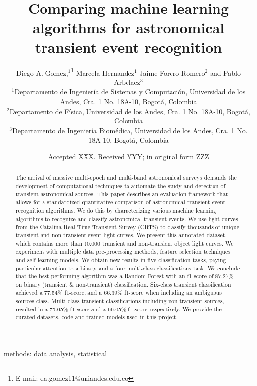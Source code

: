 \documentclass[a4paper,fleqn,usenatbib]{mnras}
\title[Comparing machine learning algorithms for astronomical transient event recognition]{Comparing machine learning algorithms for astronomical transient event recognition}
\author[Diego. A. Gomez et al.]{
Diego A. Gomez,$^{1}$\thanks{E-mail: da.gomez11@uniandes.edu.co}
Marcela Hernandez$^{1}$   
Jaime Forero-Romero$^{2}$
and Pablo Arbelaez$^{3}$
\\
$^{1}$Departamento de Ingenier\'ia de Sistemas y Computaci\'on, Universidad de los Andes, Cra. 1 No. 18A-10, Bogot\'a, Colombia\\
$^{2}$Departamento de F\'isica, Universidad de los Andes, Cra. 1 No. 18A-10, Bogot\'a, Colombia\\
$^{3}$Departamento de Ingenier\'ia Biom\'edica, Universidad de los Andes, Cra. 1 No. 18A-10, Bogot\'a, Colombia
}
\date{Accepted XXX. Received YYY; in original form ZZZ}
\begin{document}
\label{firstpage}
\pagerange{\pageref{firstpage}--\pageref{lastpage}}
\maketitle

\begin{abstract}




The arrival of massive multi-epoch and multi-band astronomical surveys
demands the development of computational techniques to automate the
study and detection of transient astronomical sources. 
This paper describes an evaluation framework that allows for a standardized quantitative comparison of astronomical transient event recognition algorithms. 
We do this by characterizing various machine learning algorithms to
recognize and classify astronomical transient events.
We use light-curves from the Catalina Real Time Transient Survey
(CRTS) to classify thousands of unique transient and non-transient
event light-curves.
We present this annotated dataset, which contains more than $10.000$ transient and non-transient object light curves.
We experiment with multiple data pre-processing methods,
feature selection techniques and self-learning models. 
We obtain new results in five classification tasks, paying particular
attention to a binary and a four multi-class classifications task.  
We conclude that the best performing algorithm was
a Random Forest with an f1-score of 87.27\% on binary
(transient \& non-transient) classification. 
Six-class transient classification achieved a 77.54\% f1-score, and a 
66.39\% f1-score when including an ambiguous sources class.
Multi-class transient classifications including non-transient sources,
resulted in a 75.05\% f1-score and a 66.05\% f1-score respectively.
We provide the curated datasets, code and trained models used in this project.

\end{abstract}

\begin{keywords}
methods: data analysis, statistical
\end{keywords}
\end{document}
